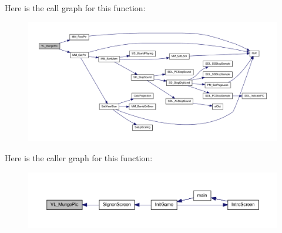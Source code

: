 Here is the call graph for this function:
\nopagebreak
\begin{figure}[H]
\begin{center}
\leavevmode
\includegraphics[width=400pt]{ID__VL_8H_a3d96886ea2eea0773d12d9c494ecd8dc_cgraph}
\end{center}
\end{figure}




Here is the caller graph for this function:
\nopagebreak
\begin{figure}[H]
\begin{center}
\leavevmode
\includegraphics[width=400pt]{ID__VL_8H_a3d96886ea2eea0773d12d9c494ecd8dc_icgraph}
\end{center}
\end{figure}


